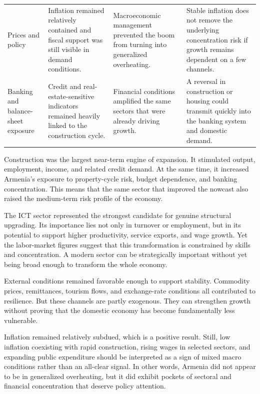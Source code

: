 \documentclass[12pt,a4paper]{report}
\begin{document}
\begin{longtable}{@{}>{\raggedright\arraybackslash}p{2.35cm}>{\raggedright\arraybackslash}p{4.05cm}>{\raggedright\arraybackslash}p{4.05cm}>{\raggedright\arraybackslash}p{4.05cm}@{}}
    Prices and policy & Inflation remained relatively contained and fiscal support was still visible in demand conditions. & Macroeconomic management prevented the boom from turning into generalized overheating. & Stable inflation does not remove the underlying concentration risk if growth remains dependent on a few channels. \\
    Banking and balance-sheet exposure & Credit and real-estate-sensitive indicators remained heavily linked to the construction cycle. & Financial conditions amplified the same sectors that were already driving growth. & A reversal in construction or housing could transmit quickly into the banking system and domestic demand. \\
\end{longtable}
\endgroup

Construction was the largest near-term engine of expansion. It stimulated output, employment, income, and related credit demand. At the same time, it increased Armenia's exposure to property-cycle risk, budget dependence, and banking concentration. This means that the same sector that improved the nowcast also raised the medium-term risk profile of the economy.

The ICT sector represented the strongest candidate for genuine structural upgrading. Its importance lies not only in turnover or employment, but in its potential to support higher productivity, service exports, and wage growth. Yet the labor-market figures suggest that this transformation is constrained by skills and concentration. A modern sector can be strategically important without yet being broad enough to transform the whole economy.

External conditions remained favorable enough to support stability. Commodity prices, remittances, tourism flows, and exchange-rate conditions all contributed to resilience. But these channels are partly exogenous. They can strengthen growth without proving that the domestic economy has become fundamentally less vulnerable.

Inflation remained relatively subdued, which is a positive result. Still, low inflation coexisting with rapid construction, rising wages in selected sectors, and expanding public expenditure should be interpreted as a sign of mixed macro conditions rather than an all-clear signal. In other words, Armenia did not appear to be in generalized overheating, but it did exhibit pockets of sectoral and financial concentration that deserve policy attention.
\end{document}
